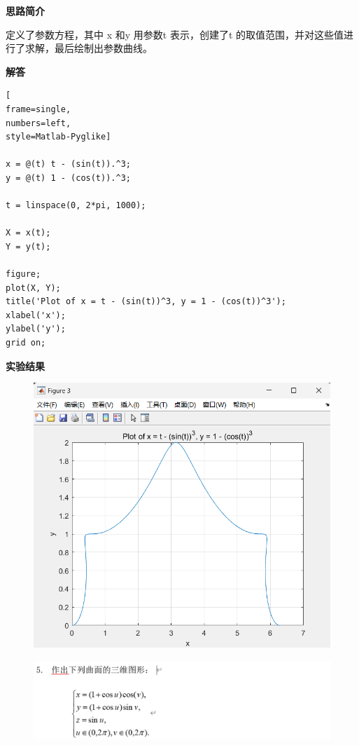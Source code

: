 \documentclass[12pt,UTF8]{ctexart}
\begin{document}
\par \textbf{思路简介}
\par 定义了参数方程，其中 x 和y 用参数t 表示，创建了t 的取值范围，并对这些值进行了求解，最后绘制出参数曲线。
\par \textbf{解答}

\begin{lstlisting}[
frame=single,
numbers=left,
style=Matlab-Pyglike]

x = @(t) t - (sin(t)).^3;
y = @(t) 1 - (cos(t)).^3;

t = linspace(0, 2*pi, 1000);

X = x(t);
Y = y(t);

figure;
plot(X, Y);
title('Plot of x = t - (sin(t))^3, y = 1 - (cos(t))^3');
xlabel('x');
ylabel('y');
grid on;

\end{lstlisting}

\par \textbf{实验结果}
\begin{figure}
    \centering
    \includegraphics[width=0.75\linewidth]{4.1.png}
    
    
\end{figure}
\clearpage


\begin{figure}
    \centering
    \includegraphics[width=1\linewidth]{++5.png}
    
    
\end{figure}
\end{document}
